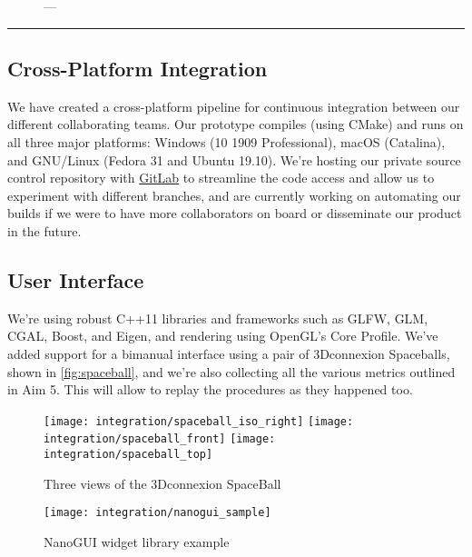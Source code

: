 \begin{figure}
  \centering%
	\caption{---}\label{fig:stereo}
\end{figure}

\hrule%

\subsection{Cross-Platform Integration}\label{ssec:cross}
We have created a cross-platform pipeline for continuous integration between our different collaborating teams. Our prototype compiles (using CMake) and runs on all three major platforms: Windows (10 1909 Professional), macOS (Catalina), and GNU/Linux (Fedora 31 and Ubuntu 19.10). We're hosting our private source control repository with \href{https://gitlab.com}{GitLab} to streamline the code access and allow us to experiment with different branches, and are currently working on automating our builds if we were to have more collaborators on board or disseminate our product in the future.

\subsection{User Interface}\label{ssec:console}

We're using robust C++11 libraries and frameworks such as GLFW, GLM, CGAL, Boost, and Eigen, and rendering using OpenGL's Core Profile. We've added support for a bimanual interface using a pair of 3Dconnexion Spaceballs, shown in \autoref{fig:spaceball}, and we're also collecting all the various metrics outlined in Aim 5. This will allow to replay the procedures as they happened too.

\begin{figure}
  \centering%
  \texttt{[image: integration/spaceball\_iso\_right]}
  \hfill%
  \texttt{[image: integration/spaceball\_front]}
  \hfill%
  \texttt{[image: integration/spaceball\_top]}
  \caption{Three views of the 3Dconnexion SpaceBall}\label{fig:spaceball}
\end{figure}

\begin{figure}
  \centering%
  \texttt{[image: integration/nanogui\_sample]}
  \caption{NanoGUI widget library example}\label{fig:nanogui}
\end{figure}


